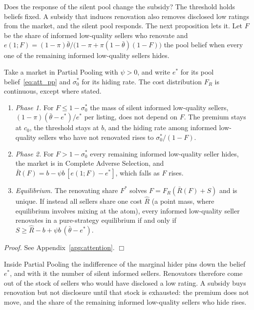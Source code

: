 \documentclass[10pt,letterpaper]{bp-template-concise}
\begin{document}
Does the response of the silent pool change the subsidy? The threshold holds beliefs fixed. A subsidy that induces renovation also removes disclosed low ratings from the market, and the silent pool responds. The next proposition lets it. Let $F$ be the share of informed low-quality sellers who renovate and $e(1;F)=(1-\pi)\bar\theta/\big(1-\pi+\pi(1-\bar\theta)(1-F)\big)$ the pool belief when every one of the remaining informed low-quality sellers hides.

\begin{proposition}
\label{prop:subsidy_ge}
Take a market in Partial Pooling with $\psi>0$, and write $e^*$ for its pool belief~\eqref{eq:att_pp} and $\sigma_0^*$ for its hiding rate. The cost distribution $F_R$ is continuous, except where stated.
\begin{enumerate}[label=(\roman*)]
    \item \emph{Phase 1.} For $F\le1-\sigma_0^*$ the mass of silent informed low-quality sellers, $(1-\pi)(\bar\theta-e^*)/e^*$ per listing, does not depend on $F$. The premium stays at $c_0$, the threshold stays at $b$, and the hiding rate among informed low-quality sellers who have not renovated rises to $\sigma_0^*/(1-F)$.
    \item \emph{Phase 2.} For $F>1-\sigma_0^*$ every remaining informed low-quality seller hides, the market is in Complete Adverse Selection, and $\bar R(F)=b-\psi b\,[e(1;F)-e^*]$, which falls as $F$ rises.
    \item \emph{Equilibrium.} The renovating share $F^*$ solves $F=F_R(\bar R(F)+S)$ and is unique. If instead all sellers share one cost $\hat R$ (a point mass, where equilibrium involves mixing at the atom), every informed low-quality seller renovates in a pure-strategy equilibrium if and only if $S\ge\hat R-b+\psi b\,(\bar\theta-e^*)$.
\end{enumerate}
\end{proposition}

\noindent\textit{Proof.} See Appendix~\ref{app:attention}. $\Box$

\medskip

Inside Partial Pooling the indifference of the marginal hider pins down the belief $e^*$, and with it the number of silent informed sellers. Renovators therefore come out of the stock of sellers who would have disclosed a low rating. A subsidy buys renovation but not disclosure until that stock is exhausted: the premium does not move, and the share of the remaining informed low-quality sellers who hide rises. 
\end{document}
